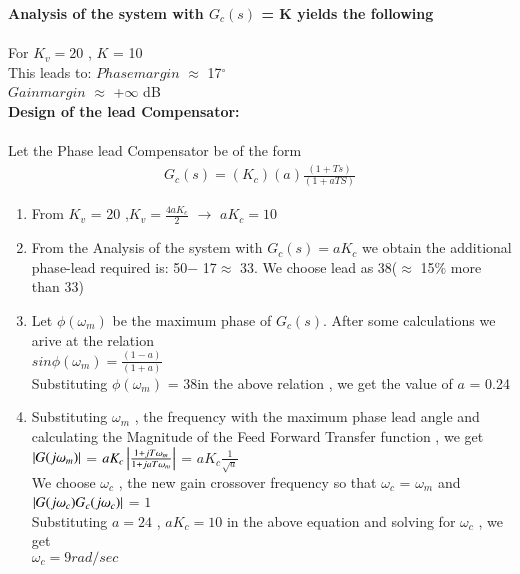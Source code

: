 \begin{enumerate}[label=\thesection.\arabic*.,ref=\thesection.\theenumi]
\textbf{Analysis of the system with $G_c(s)$ = K yields the following }\\ \\
   For $K_v = 20$ , $K$ = 10 \\
   This leads to: $ Phase margin$ $\approx$ 17$^{\circ}$  \\
                  $ Gain margin$ $\approx$ +$\infty$ dB  \\

\textbf{Design of the lead Compensator:  }\\ \\
Let the Phase lead Compensator be of the form  \\
\begin{align}
G_c(s) = (K_c)(a)\frac{(1+Ts)}{(1+aTS)}
\end{align}
 
\begin{enumerate}
  \item From $K_v$ = 20 ,$K_v = \frac{4aK_c}{2}$  $\to$ $ aK_c = 10$\\
  \item From the Analysis of the system with $G_c(s) = aK_c$ we obtain the additional phase-lead required is: 50\degree $-$ 17\degree $\approx$ 33\degree . We choose lead as 38\degree ($\approx$ 15$\%$ more than 33\degree ) \\
  \item Let $\phi(\omega_m)$ be the maximum phase of $G_c (s)$. After some calculations we arive at the relation \\
    $sin\phi(\omega_m) = \frac{(1-a)}{(1+a)}$ \\
   Substituting $\phi(\omega_m)$ = 38\degree in the above relation , we get the value of $a$ = 0.24 \\
  \item Substituting  $\omega_m$ ,  the frequency with the maximum phase lead angle  and calculating the Magnitude of the Feed Forward Transfer function , we get \\            
  
   $\left\vert G{(j\omega_{m})}\right\vert$ = $aK_c\left\vert\frac{1+jT\omega_m}{{ 1 + jaT\omega_m}}\right\vert$ = $aK_c\frac{1}{\sqrt{a}}$ \\
 We choose $\omega_c$ , the new gain crossover frequency so that $\omega_c$ = $\omega_m$ and \\
 $\left\vert G{(j\omega_{c})}G_c{(j\omega_{c})}\right\vert$ = $1$ \\
 Substituting $a = 24$ , $aK_c = 10$ in the above equation and solving for $\omega_c$ , we get \\
 $\omega_c = 9 rad/sec $


\end{enumerate}
\end{enumerate}
